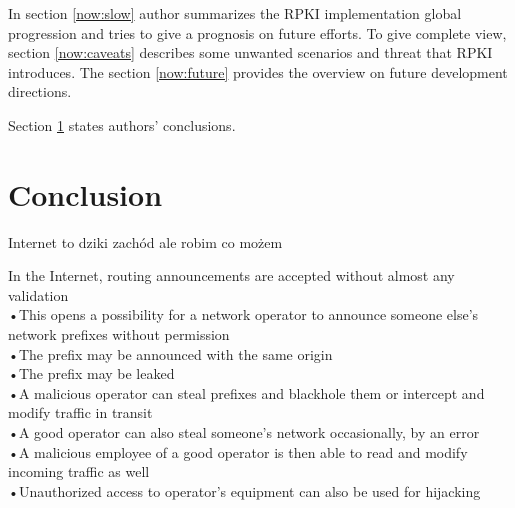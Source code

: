 \documentclass[journal,a4paper,twoside]{IEEEtran}
\begin{document}
In section \ref{now:slow} author summarizes the RPKI implementation global progression and tries to give a prognosis on future efforts. To give complete view, section \ref{now:caveats} describes some unwanted scenarios and threat that RPKI introduces. The section \ref{now:future} provides the overview on future development directions.

Section \ref{conclusion} states authors' conclusions.













\section{Conclusion}
\label{conclusion}

Internet to dziki zachód ale robim co możem 

\begin{displayquote}
	In the Internet, routing announcements are accepted without almost any validation\\
	•This opens a possibility for a network operator to announce someone else's network prefixes without permission\\
	•The prefix may be announced with the same origin\\
	•The prefix may be leaked\\
	•A malicious operator can steal prefixes and blackhole them or intercept and modify traffic in transit\\
	•A good operator can also steal someone's network occasionally, by an error\\
	•A malicious employee of a good operator is then able to read and modify incoming traffic as well\\
	•Unauthorized access to operator's equipment can also be used for hijacking
	\cite{Gavrichenkov2015}
	
	\end{displayquote}
	



\end{document}
